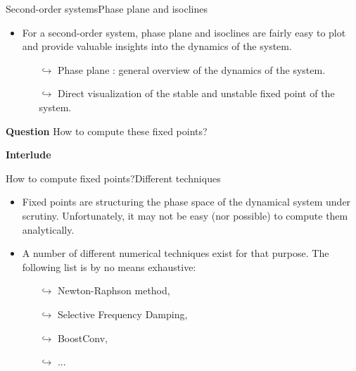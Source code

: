 \documentclass[usenames,dvipsnames,svgnames,10pt,aspectratio=169]{beamer}
\begin{document}
\begin{frame}[t, c]{Second-order systems}{Phase plane and isoclines}
	\begin{itemize}
		\item For a second-order system, phase plane and isoclines are fairly easy to plot and provide valuable insights into the dynamics of the system.
		\begin{itemize}
			\item[$\hookrightarrow$] Phase plane : general overview of the dynamics of the system.

			\item[$\hookrightarrow$] Direct visualization of the stable and unstable fixed point of the system.
		\end{itemize}
	\end{itemize}

	\bigskip

	\begin{block}{\centering \textbf{Question}}
		\centering
		How to compute these fixed points?
	\end{block}
\end{frame}

\begin{frame}[t, c]{}
	\centering
	\vspace{1cm}

	{\Large \textbf{Interlude}}

	\bigskip

	{}

\end{frame}

\begin{frame}[t, c]{How to compute fixed points?}{Different techniques}
	\begin{itemize}
		\item Fixed points are structuring the phase space of the dynamical system under scrutiny. Unfortunately, it may not be easy (nor possible) to compute them analytically.

		\bigskip

		\item A number of different numerical techniques exist for that purpose. The following list is by no means exhaustive:
		\begin{itemize}
			\item[$\hookrightarrow$] Newton-Raphson method,
			\item[$\hookrightarrow$] Selective Frequency Damping,
			\item[$\hookrightarrow$] BoostConv,
			\item[$\hookrightarrow$] ...
		\end{itemize}
	\end{itemize}

	\vspace{1cm}
\end{frame}
\end{document}
